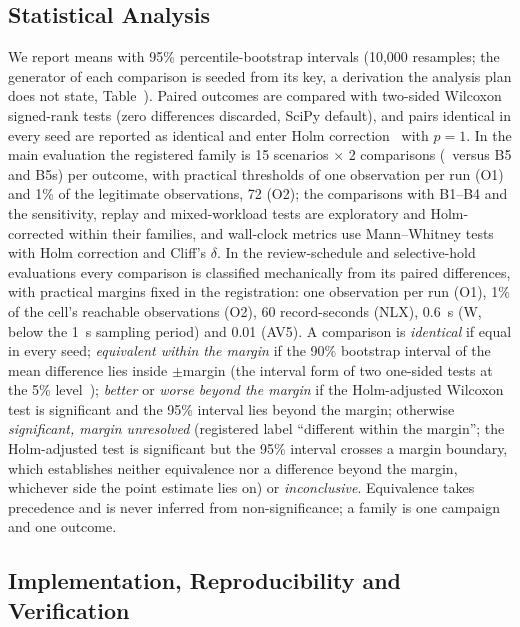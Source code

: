 \subsection{Statistical Analysis}\label{sec:stats}

We report means with 95\% percentile-bootstrap intervals (10,000 resamples; the generator of each comparison is seeded from its key, a derivation the analysis plan does not state, Table~). Paired outcomes are compared with two-sided Wilcoxon signed-rank tests (zero differences discarded, SciPy default), and pairs identical in every seed are reported as identical and enter Holm correction~\cite{holm1979} with $p=1$. In the main evaluation the registered family is 15 scenarios $\times$ 2 comparisons (\sys\ versus B5 and B5s) per outcome, with practical thresholds of one observation per run (O1) and 1\% of the legitimate observations, 72 (O2); the comparisons with B1--B4 and the sensitivity, replay and mixed-workload tests are exploratory and Holm-corrected within their families, and wall-clock metrics use Mann--Whitney tests with Holm correction and Cliff's $\delta$. In the review-schedule and selective-hold evaluations every comparison is classified mechanically from its paired differences, with practical margins fixed in the registration: one observation per run (O1), 1\% of the cell's reachable observations (O2), 60 record-seconds (NLX), 0.6~s (W, below the 1~s sampling period) and 0.01 (AV5). A comparison is \emph{identical} if equal in every seed; \emph{equivalent within the margin} if the 90\% bootstrap interval of the mean difference lies inside $\pm$margin (the interval form of two one-sided tests at the 5\% level~\cite{schuirmann1987}); \emph{better} or \emph{worse beyond the margin} if the Holm-adjusted Wilcoxon test is significant and the 95\% interval lies beyond the margin; otherwise \emph{significant, margin unresolved} (registered label ``different within the margin''; the Holm-adjusted test is significant but the 95\% interval crosses a margin boundary, which establishes neither equivalence nor a difference beyond the margin, whichever side the point estimate lies on) or \emph{inconclusive}. Equivalence takes precedence and is never inferred from non-significance; a family is one campaign and one outcome.

\subsection{Implementation, Reproducibility and Verification}\label{sec:impl}


